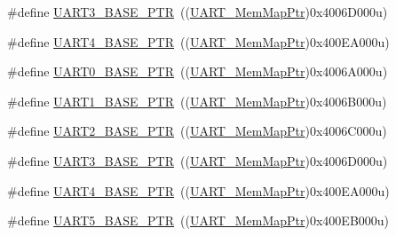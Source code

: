 \begin{DoxyCompactItemize}
\item 
\#define \hyperlink{group___u_a_r_t___peripheral_gadf42d0466618b9209401839e1af9b3c4}{U\+A\+R\+T3\+\_\+\+B\+A\+S\+E\+\_\+\+P\+TR}~((\hyperlink{group___u_a_r_t___peripheral_ga306cf44b593fadbb29a065f42e3f68f0}{U\+A\+R\+T\+\_\+\+Mem\+Map\+Ptr})0x4006\+D000u)
\item 
\#define \hyperlink{group___u_a_r_t___peripheral_ga680f97e081544c697ee071702b2de587}{U\+A\+R\+T4\+\_\+\+B\+A\+S\+E\+\_\+\+P\+TR}~((\hyperlink{group___u_a_r_t___peripheral_ga306cf44b593fadbb29a065f42e3f68f0}{U\+A\+R\+T\+\_\+\+Mem\+Map\+Ptr})0x400\+E\+A000u)
\item 
\#define \hyperlink{group___u_a_r_t___peripheral_ga50a02c91ffbd11fa7b4f0c33fe585199}{U\+A\+R\+T0\+\_\+\+B\+A\+S\+E\+\_\+\+P\+TR}~((\hyperlink{group___u_a_r_t___peripheral_ga306cf44b593fadbb29a065f42e3f68f0}{U\+A\+R\+T\+\_\+\+Mem\+Map\+Ptr})0x4006\+A000u)
\item 
\#define \hyperlink{group___u_a_r_t___peripheral_gafb5b1236c1cdf2d9a6464251b791030c}{U\+A\+R\+T1\+\_\+\+B\+A\+S\+E\+\_\+\+P\+TR}~((\hyperlink{group___u_a_r_t___peripheral_ga306cf44b593fadbb29a065f42e3f68f0}{U\+A\+R\+T\+\_\+\+Mem\+Map\+Ptr})0x4006\+B000u)
\item 
\#define \hyperlink{group___u_a_r_t___peripheral_ga75ca2ea4e490b3c1c7aa55fc9c25cd37}{U\+A\+R\+T2\+\_\+\+B\+A\+S\+E\+\_\+\+P\+TR}~((\hyperlink{group___u_a_r_t___peripheral_ga306cf44b593fadbb29a065f42e3f68f0}{U\+A\+R\+T\+\_\+\+Mem\+Map\+Ptr})0x4006\+C000u)
\item 
\#define \hyperlink{group___u_a_r_t___peripheral_gadf42d0466618b9209401839e1af9b3c4}{U\+A\+R\+T3\+\_\+\+B\+A\+S\+E\+\_\+\+P\+TR}~((\hyperlink{group___u_a_r_t___peripheral_ga306cf44b593fadbb29a065f42e3f68f0}{U\+A\+R\+T\+\_\+\+Mem\+Map\+Ptr})0x4006\+D000u)
\item 
\#define \hyperlink{group___u_a_r_t___peripheral_ga680f97e081544c697ee071702b2de587}{U\+A\+R\+T4\+\_\+\+B\+A\+S\+E\+\_\+\+P\+TR}~((\hyperlink{group___u_a_r_t___peripheral_ga306cf44b593fadbb29a065f42e3f68f0}{U\+A\+R\+T\+\_\+\+Mem\+Map\+Ptr})0x400\+E\+A000u)
\item 
\#define \hyperlink{group___u_a_r_t___peripheral_gace0110558cde93abab79b033e3caf755}{U\+A\+R\+T5\+\_\+\+B\+A\+S\+E\+\_\+\+P\+TR}~((\hyperlink{group___u_a_r_t___peripheral_ga306cf44b593fadbb29a065f42e3f68f0}{U\+A\+R\+T\+\_\+\+Mem\+Map\+Ptr})0x400\+E\+B000u)
\end{DoxyCompactItemize}
